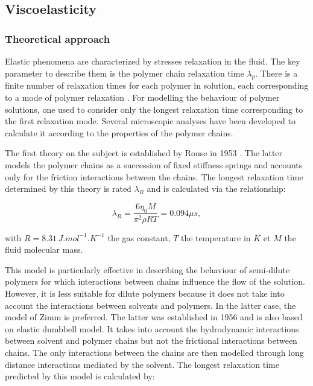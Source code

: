 \documentclass[twocolumn,10pt]{asme2ej}
\begin{document}
\subsection*{Viscoelasticity}
\subsubsection*{Theoretical approach}
Elastic phenomena are characterized by stresses relaxation in the fluid. The key parameter to describe them is the polymer chain relaxation time $\lambda_p$. There is a finite number of relaxation times for each polymer in solution, each corresponding to a mode of polymer relaxation \cite{de1979scaling}. For modelling the behaviour of polymer solutions, one used to consider only the longest relaxation time corresponding to the first relaxation mode. Several microscopic analyses have been developed to calculate it according to the properties of the polymer chains.

The first theory on the subject is established by Rouse in 1953 \cite{rouse1953theory}.  The latter models the polymer chains as a succession of fixed stiffness springs and accounts only for the friction interactions between the chains. The longest relaxation time determined by this theory is rated $\lambda_R$ and is calculated via the relationship:

\begin{equation}
    \lambda_R = \frac{6 \eta_0 M}{\pi^2 \rho R T} = 0.094 \mu s,
    \label{rouse} 
\end{equation}

with $R = 8.31 \, J.mol^{-1}.K^{-1}$ the gas constant, $T$ the temperature in $K$ et $M$ the fluid molecular mass. 

This model is particularly effective in describing the behaviour of semi-dilute polymers for which interactions between chains influence the flow of the solution. However, it is less suitable for dilute polymers because it does not take into account the interactions between solvents and polymers. In the latter case, the model of Zimm \cite{zimm1956dynamics} is preferred. The latter was established in 1956 and is also based on elastic dumbbell model. It takes into account the hydrodynamic interactions between solvent and polymer chains but not the frictional interactions between chains. The only interactions between the chains are then modelled through long distance interactions mediated by the solvent. The longest relaxation time predicted by this model is calculated by:
\end{document}
